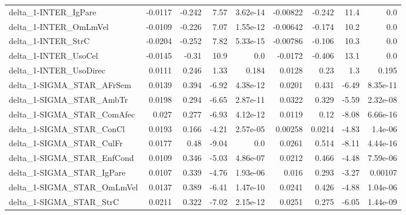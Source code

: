 \begin{tabular}{lrrrrrrrr}
delta\_1-INTER\_IgPare                   &     -0.0117 &       -0.242 &     7.57 & 3.62e-14 &   -0.00822 &      -0.242 &         11.4 &           0.0 \\
delta\_1-INTER\_OmLmVel                  &     -0.0109 &       -0.226 &     7.07 & 1.55e-12 &   -0.00642 &      -0.174 &         10.2 &           0.0 \\
delta\_1-INTER\_StrC                     &     -0.0204 &       -0.252 &     7.82 & 5.33e-15 &   -0.00786 &      -0.106 &         10.3 &           0.0 \\
delta\_1-INTER\_UsoCel                   &     -0.0145 &        -0.31 &     10.9 &      0.0 &    -0.0172 &      -0.406 &         13.1 &           0.0 \\
delta\_1-INTER\_UsoDirec                 &      0.0111 &        0.246 &     1.33 &    0.184 &     0.0128 &        0.23 &          1.3 &         0.195 \\
delta\_1-SIGMA\_STAR\_AFrSem              &      0.0139 &        0.394 &    -6.92 & 4.38e-12 &     0.0201 &       0.431 &        -6.49 &      8.35e-11 \\
delta\_1-SIGMA\_STAR\_AmbTr               &      0.0198 &        0.294 &    -6.65 & 2.87e-11 &     0.0322 &       0.329 &        -5.59 &      2.32e-08 \\
delta\_1-SIGMA\_STAR\_ComAfec             &       0.027 &        0.277 &    -6.93 & 4.12e-12 &     0.0119 &        0.12 &        -8.08 &      6.66e-16 \\
delta\_1-SIGMA\_STAR\_ConCl               &      0.0193 &        0.166 &    -4.21 & 2.57e-05 &    0.00258 &      0.0214 &        -4.83 &       1.4e-06 \\
delta\_1-SIGMA\_STAR\_CulFr               &      0.0177 &         0.48 &    -9.04 &      0.0 &     0.0261 &       0.514 &        -8.11 &      4.44e-16 \\
delta\_1-SIGMA\_STAR\_EnfCond             &      0.0109 &        0.346 &    -5.03 & 4.86e-07 &     0.0212 &       0.466 &        -4.48 &      7.59e-06 \\
delta\_1-SIGMA\_STAR\_IgPare              &      0.0107 &        0.339 &    -4.76 & 1.93e-06 &      0.016 &       0.293 &        -3.27 &       0.00107 \\
delta\_1-SIGMA\_STAR\_OmLmVel             &      0.0137 &        0.389 &    -6.41 & 1.47e-10 &     0.0241 &       0.426 &        -4.88 &      1.04e-06 \\
delta\_1-SIGMA\_STAR\_StrC                &      0.0211 &        0.322 &    -7.02 & 2.15e-12 &     0.0251 &       0.275 &        -6.05 &      1.44e-09 \\

\end{tabular}
